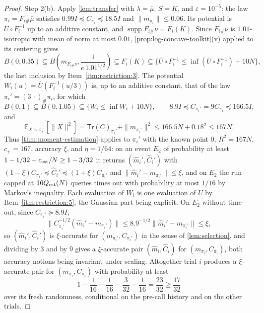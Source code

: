\documentclass[11pt]{article}
\numberwithin{equation}{section}
\theoremstyle{definition}
\newcommand{\eps}{\varepsilon}
\newcommand{\E}[2]{\mathbb{E}_{#1}\left[#2\right]}
\newcommand{\Tr}[1]{\mathsf{Tr}\left(#1\right)}
\begin{document}
\begin{proof}
Step 2(b).
Apply \cref{lem:transfer} with $\lambda=\bar\mu$,
$S=K$, and
$\eps=10^{-5}$: the law
$\pi_i=F_{i\#}\bar\mu$ satisfies
$0.99I\preceq C_{\pi_i}\preceq18.5I$ and
$\|m_{\pi_i}\|\leq0.06$.
Its potential is $\bar U\circ F_i^{-1}$ up to an additive constant, and
$\operatorname{supp}F_{i\#}\nu=F_i(K)$.
Since $F_{i\#}\nu$ is
$1.01$-isotropic with mean of norm at most
$0.01$, \cref{prop:log-concave-toolkit}(v) applied to its centering gives
\[
 B(0,0.35)
 \subseteq B\!\left(m_{F_{i\#}\nu},\frac{1}{e\,1.01^{1/2}}\right)
 \subseteq F_i(K)
 \subseteq\{\bar U\circ F_i^{-1}\leq\inf(\bar U\circ F_i^{-1})+10N\},
\]
the last inclusion by Item~\ref{itm:restriction:3}.
The potential $W_i(u)=\bar U(F_i^{-1}(u/3))$ is, up to an additive constant,
that of the law
$\pi_i'=(3\,\cdot)_\#\pi_i$, for which
\[
 B(0,1)\subseteq B(0,1.05)\subseteq\{W_i\leq\inf W_i+10N\},
 \qquad
 8.9I\preceq C_{\pi_i'}=9C_{\pi_i}\preceq166.5I,
\]
and
\[
 \E{X\sim\pi_i'}{\|X\|^2}
 =\Tr C_{\pi_i'}+\|m_{\pi_i'}\|^2
 \leq166.5N+0.18^2
 \leq167N .
\]
Thus \cref{thm:moment-estimation} applies to $\pi_i'$ with the known point
$0$,
$R^2=167N$,
$c_+=167$, accuracy
$\xi$, and
$\eta=1/64$: on an event
$E_2$ of probability at least
$1-1/32-c_{\rm est}/N\geq1-3/32$ it returns
$(\widehat m_i',\widehat C_i')$ with
$(1-\xi)C_{\pi_i'}\preceq\widehat C_i'\preceq(1+\xi)C_{\pi_i'}$ and
$\|\widehat m_i'-m_{\pi_i'}\|\leq\xi$, and on
$E_2$ the run capped at
$16Q_{\rm est}(N)$ queries times out with probability at most
$1/16$ by Markov's inequality.
Each evaluation of $W_i$ is one evaluation of
$U$ by Item~\ref{itm:restriction:5}, the Gaussian part being explicit.
On $E_2$ without time-out, since
$C_{\pi_i'}\succeq8.9I$,
\[
 \|C_{\pi_i'}^{-1/2}(\widehat m_i'-m_{\pi_i'})\|
 \leq8.9^{-1/2}\|\widehat m_i'-m_{\pi_i'}\|
 \leq\xi ,
\]
so $(\widehat m_i',\widehat C_i')$ is
$\xi$-accurate for
$(m_{\pi_i'},C_{\pi_i'})$ in the sense of \cref{lem:selection}, and dividing
by
$3$ and by
$9$ gives a
$\xi$-accurate pair
$(\widehat m_i,\widehat C_i)$ for
$(m_{\pi_i},C_{\pi_i})$, both accuracy notions being invariant under
scaling.
Altogether trial $i$ produces a
$\xi$-accurate pair for
$(m_{\pi_i},C_{\pi_i})$ with probability at least
\[
 1-\frac1{16}-\frac1{16}-\frac{3}{32}-\frac1{16}
 =\frac{23}{32}
 \geq\frac{17}{32}
\]
over its fresh randomness, conditional on the pre-call history and on the
other trials.


\end{proof}
\end{document}
